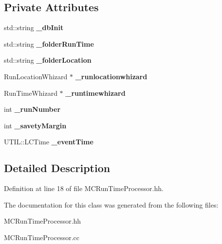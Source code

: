 \subsection*{Private Attributes}
\begin{DoxyCompactItemize}
\item 
std\-::string {\bfseries \-\_\-db\-Init}\label{classmarlin_1_1MCRunTimeProcessor_a4e743478c041ee93d3256134520e3c49}

\item 
std\-::string {\bfseries \-\_\-folder\-Run\-Time}\label{classmarlin_1_1MCRunTimeProcessor_a30df635002d96b32291813aa3f91d585}

\item 
std\-::string {\bfseries \-\_\-folder\-Location}\label{classmarlin_1_1MCRunTimeProcessor_a2be1163f77699025a223cd1ebb1040f4}

\item 
Run\-Location\-Whizard $\ast$ {\bfseries \-\_\-runlocationwhizard}\label{classmarlin_1_1MCRunTimeProcessor_a29bd192e54ae09e3b3dd9240b2f7ac23}

\item 
Run\-Time\-Whizard $\ast$ {\bfseries \-\_\-runtimewhizard}\label{classmarlin_1_1MCRunTimeProcessor_a136eebf08c52e00b691e7ad562ebae76}

\item 
int {\bfseries \-\_\-run\-Number}\label{classmarlin_1_1MCRunTimeProcessor_a9e3dea800b1c0e2104a00a5007714ddd}

\item 
int {\bfseries \-\_\-savety\-Margin}\label{classmarlin_1_1MCRunTimeProcessor_ae97bf35ad864f1bafba1864de9d03bc5}

\item 
U\-T\-I\-L\-::\-L\-C\-Time {\bfseries \-\_\-event\-Time}\label{classmarlin_1_1MCRunTimeProcessor_a119971e6c2b38d2ff99240191f82ce09}

\end{DoxyCompactItemize}


\subsection{Detailed Description}


Definition at line 18 of file M\-C\-Run\-Time\-Processor.\-hh.



The documentation for this class was generated from the following files\-:\begin{DoxyCompactItemize}
\item 
M\-C\-Run\-Time\-Processor.\-hh\item 
M\-C\-Run\-Time\-Processor.\-cc\end{DoxyCompactItemize}
